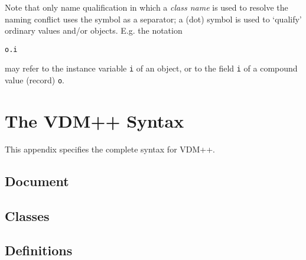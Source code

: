\documentclass[\pformat,12pt]{article}
\newcommand{\vdmpp}{VDM++}
\begin{document}
Note that only name qualification in which a {\em class name} is used to
resolve the naming conflict uses the  symbol as a separator; a
 (dot) symbol is used to `qualify' ordinary values and/or objects.
E.g. the notation
  \begin{alltt}
    o.i
  \end{alltt}
may refer to the instance variable {\tt i} of an object, or to the
field {\tt i} of a compound value (record) {\tt o}.


\newpage

%



\newpage
\appendix


\section{The  VDM++ Syntax} \label{app-a}
This appendix specifies the complete syntax for 
\vdmpp.
\subsection{Document}



\subsection{Classes}


\subsection{Definitions}



\end{document}
